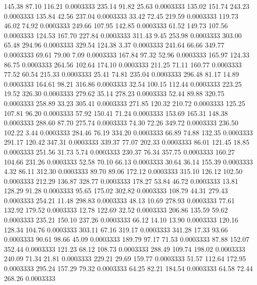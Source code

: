  145.38   87.10  116.21   0.0003333
 235.14   91.82   25.63   0.0003333
 135.02  151.74  243.23   0.0003333
 135.84   42.56  237.04   0.0003333
  33.42   72.45  219.59   0.0003333
 119.73   46.02   74.92   0.0003333
 249.66  107.95  142.85   0.0003333
  61.52  149.73  107.56   0.0003333
 124.53  167.70  227.84   0.0003333
 311.43    9.45  253.98   0.0003333
 303.00   65.48  294.96   0.0003333
 329.54  124.38    3.37   0.0003333
 241.64   66.66  349.77   0.0003333
  69.61   79.00    7.09   0.0003333
 167.84   97.32   52.96   0.0003333
 165.97  124.33   86.75   0.0003333
 264.56  102.64  174.10   0.0003333
 211.25   71.11  160.77   0.0003333
  77.52   60.54  215.33   0.0003333
  25.41   74.81  235.04   0.0003333
 296.48   81.17   14.89   0.0003333
 164.61   98.21  316.86   0.0003333
  32.54  100.15  112.44   0.0003333
 223.25   19.52  326.30   0.0003333
 279.62   35.14  278.23   0.0003333
  52.44   89.88  320.75   0.0003333
 258.89   33.23  305.41   0.0003333
 271.85  120.32  210.72   0.0003333
 125.25  107.81   96.20   0.0003333
  57.92  150.41   71.24   0.0003333
 153.69  165.31  148.38   0.0003333
 288.60   87.70  275.74   0.0003333
  74.30   72.26  349.72   0.0003333
 236.50  102.22    3.44   0.0003333
 284.46   76.19  334.20   0.0003333
  66.89   74.88  132.35   0.0003333
 291.17  120.42  347.31   0.0003333
 339.37   77.07  202.33   0.0003333
  86.01  121.45   18.85   0.0003333
 251.56   31.73    5.74   0.0003333
 230.37   76.34  357.75   0.0003333
 160.27  104.66  231.26   0.0003333
  52.58   70.10   66.13   0.0003333
  30.64   36.14  155.39   0.0003333
   4.32   86.11  312.30   0.0003333
  89.70   89.06  172.12   0.0003333
 315.10  126.12  102.50   0.0003333
 212.29  136.87  328.77   0.0003333
 178.27   53.84   46.72   0.0003333
  13.81  128.29   91.28   0.0003333
  95.65  175.02  302.82   0.0003333
 108.79   44.31  279.43   0.0003333
 254.21   11.48  298.83   0.0003333
  48.13   10.69  278.93   0.0003333
  77.61  132.92  179.52   0.0003333
  12.78  122.69   32.52   0.0003333
 206.86  135.59   59.62   0.0003333
 235.21  150.10  237.26   0.0003333
  66.12   14.10   13.90   0.0003333
 120.16  128.34  104.76   0.0003333
 303.11   67.16  319.17   0.0003333
 341.28   17.33   93.66   0.0003333
  90.61   98.66   45.09   0.0003333
 189.79   97.17   71.53   0.0003333
  87.88  152.07  352.44   0.0003333
 121.23   68.12  108.73   0.0003333
 288.49  109.74  198.02   0.0003333
 240.09   71.34   21.81   0.0003333
 229.21   29.69  159.77   0.0003333
  51.57  112.64  172.95   0.0003333
 295.24  157.29   79.32   0.0003333
  64.25   82.21  184.54   0.0003333
  64.58   72.44  268.26   0.0003333
